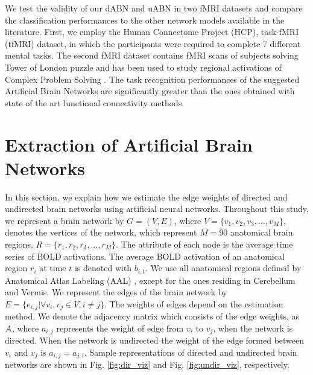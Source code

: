 \documentclass[runningheads]{llncs}
\begin{document}
We test the validity of our dABN and uABN in two fMRI datasets and compare the classification performances to the other network models available in the literature. First, we employ the Human Connectome Project (HCP), task-fMRI (tfMRI) dataset, in which the participants were required to complete 7 different mental tasks. The second fMRI dataset contains fMRI scans of subjects solving Tower of London puzzle and has been used to study regional activations of Complex Problem Solving \cite{newman2009fmri,alchihabi2018dynamic}. The task recognition performances of the suggested Artificial Brain Networks are significantly greater than the ones obtained with state of the art functional connectivity methods.



\section{Extraction of Artificial Brain Networks}



In this section, we explain how we estimate the edge weights of directed and undirected brain networks using artificial neural networks. Throughout this study, we represent a brain network by  $G=(V,E)$, where $V = \{ v_{1}, v_{2}, v_{3}, \ldots, v_{M} \}$, denotes the vertices of the network, which represent $M = 90$ anatomical brain regions, $R = \{r_{1}, r_{2}, r_{3}, \ldots, r_{M}\}$. The attribute of each node is the average time series of BOLD activations. The average  BOLD activation of an anatomical region $r_i$ at time $t$  is denoted with $b_{i,t}$. We use all anatomical regions defined by Anatomical Atlas Labeling (AAL) \cite{tzourio2002automated}, except for the ones residing in Cerebellum and Vermis. We represent the edges of the brain network by $ E = \{ e_{i,j} | \forall v_i,v_j \in V, i \neq j \} $. The weights of edges depend on the estimation method. We denote the adjacency matrix which consists of the edge weights, as $ \boldmath{A}$, where $a_{i,j}$ represents the weight of edge from $v_i$ to $v_j$, when the network is directed. When the network is undirected the weight of the edge formed between $v_i$ and $v_j$ is $a_{i,j}= a_{j,i}$. Sample representations of directed and undirected brain networks are shown in Fig. \ref{fig:dir_viz} and Fig. \ref{fig:undir_viz}, respectively.
\end{document}
